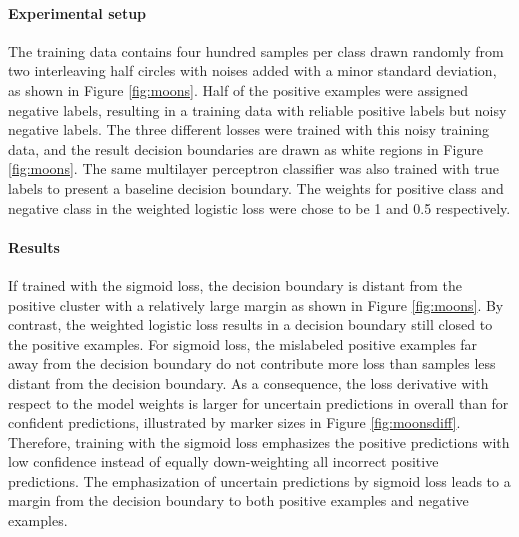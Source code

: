 \paragraph{Experimental setup}
The training data contains four hundred samples per class drawn randomly from two interleaving half circles with noises added with a minor standard deviation, as shown in Figure \ref{fig:moons}.
Half of the positive examples were assigned negative labels, resulting in a training data with reliable positive labels but noisy negative labels.
The three different losses were trained with this noisy training data, and the result decision boundaries are drawn as white regions in Figure \ref{fig:moons}.
The same multilayer perceptron classifier was also trained with true labels to present a baseline decision boundary.
The weights for positive class and negative class in the weighted logistic loss were chose to be 1 and 0.5 respectively.

\paragraph{Results}
If trained with the sigmoid loss, the decision boundary is distant from the positive cluster with a relatively large margin as shown in Figure \ref{fig:moons}.
By contrast, the weighted logistic loss results in a decision boundary still closed to the positive examples.
For sigmoid loss, the mislabeled positive examples far away from the decision boundary do not contribute more loss than samples less distant from the decision boundary.
As a consequence, the loss derivative with respect to the model weights is larger for uncertain predictions in overall than for confident predictions, illustrated by marker sizes in Figure \ref{fig:moonsdiff}.
Therefore, training with the sigmoid loss emphasizes the positive predictions with low confidence instead of equally down-weighting all incorrect positive predictions.
The emphasization of uncertain predictions by sigmoid loss leads to a margin from the decision boundary to both positive examples and negative examples.


